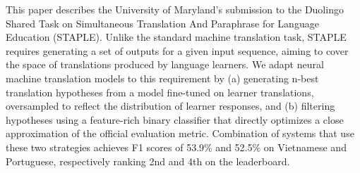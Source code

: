 This paper describes the University of Maryland's submission to the Duolingo Shared Task on Simultaneous Translation And Paraphrase for Language Education (STAPLE). Unlike the standard machine translation task, STAPLE requires generating a set of outputs for a given input sequence, aiming to cover the space of translations produced by language learners. We adapt neural machine translation models to this requirement by (a) generating n-best translation hypotheses from a model fine-tuned on learner translations, oversampled to reflect the distribution of learner responses, and (b) filtering hypotheses using a feature-rich binary classifier that directly optimizes a close approximation of the official evaluation metric. Combination of systems that use these two strategies achieves F1 scores of 53.9\% and 52.5\% on Vietnamese and Portuguese, respectively ranking 2nd and 4th on the leaderboard.
